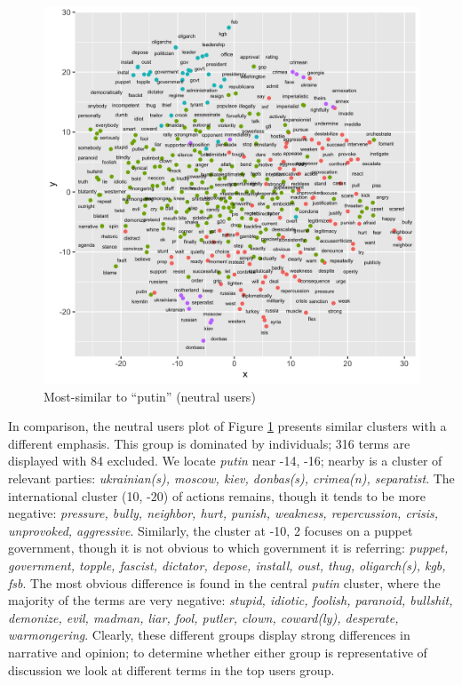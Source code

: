 \begin{figure}[!ht]
\centering
\includegraphics[width=\textwidth]{rus/neutral_putin}
\caption{Most-similar to ``putin'' (neutral users)}
\label{fig:neutral_putin}
\end{figure}

In comparison, the neutral users plot of Figure \ref{fig:neutral_putin} presents similar clusters with a different emphasis.
This group is dominated by individuals; 316 terms are displayed with 84 excluded.
We locate \emph{putin} near -14, -16; nearby is a cluster of relevant parties: \emph{ukrainian(s), moscow, kiev, donbas(s), crimea(n), separatist}.
The international cluster (10, -20) of actions remains, though it tends to be more negative: \emph{pressure, bully, neighbor, hurt, punish, weakness, repercussion, crisis, unprovoked, aggressive}.
Similarly, the cluster at -10, 2 focuses on a puppet government, though it is not obvious to which government it is referring: \emph{puppet, government, topple, fascist, dictator, depose, install, oust, thug, oligarch(s), kgb, fsb}.
The most obvious difference is found in the central \emph{putin} cluster, where the majority of the terms are very negative: \emph{stupid, idiotic, foolish, paranoid, bullshit, demonize, evil, madman, liar, fool, putler, clown, coward(ly), desperate, warmongering}.
Clearly, these different groups display strong differences in narrative and opinion; to determine whether either group is representative of discussion we look at different terms in the top users group.

